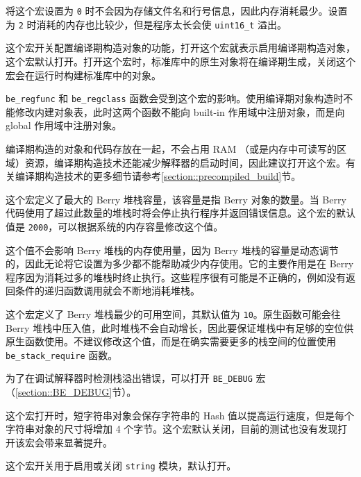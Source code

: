将这个宏设置为 \texttt{0} 时不会因为存储文件名和行号信息，因此内存消耗最少。设置为 \texttt{2} 时消耗的内存也比较少，但是程序太长会使 \texttt{uint16\_t} 溢出。


这个宏开关配置编译期构造对象的功能，打开这个宏就表示启用编译期构造对象，这个宏默认打开。打开这个宏时，标准库中的原生对象将在编译期生成，关闭这个宏会在运行时构建标准库中的对象。

\texttt{be\_regfunc} 和 \texttt{be\_regclass} 函数会受到这个宏的影响。使用编译期对象构造时不能修改内建对象表，此时这两个函数不能向 built-in 作用域中注册对象，而是向 global 作用域中注册对象。

编译期构造的对象和代码存放在一起，不会占用 RAM （或是内存中可读写的区域）资源，编译期构造技术还能减少解释器的启动时间，因此建议打开这个宏。有关编译期构造技术的更多细节请参考\ref{section::precompiled_build}节。


这个宏定义了最大的 Berry 堆栈容量，该容量是指 Berry 对象的数量。当 Berry 代码使用了超过此数量的堆栈时将会停止执行程序并返回错误信息。这个宏的默认值是 \texttt{2000}，可以根据系统的内存容量修改这个值。

这个值不会影响 Berry 堆栈的内存使用量，因为 Berry 堆栈的容量是动态调节的，因此无论将它设置为多少都不能帮助减少内存使用。它的主要作用是在 Berry 程序因为消耗过多的堆栈时终止执行。这些程序很有可能是不正确的，例如没有返回条件的递归函数调用就会不断地消耗堆栈。


这个宏定义了 Berry 堆栈最少的可用空间，其默认值为 \texttt{10}。原生函数可能会往 Berry 堆栈中压入值，此时堆栈不会自动增长，因此要保证堆栈中有足够的空位供原生函数使用。不建议修改这个值，而是在确实需要更多的栈空间的位置使用 \texttt{be\_stack\_require} 函数。

为了在调试解释器时检测栈溢出错误，可以打开 \texttt{BE\_DEBUG} 宏（\ref{section::BE_DEBUG}节）。


这个宏打开时，短字符串对象会保存字符串的 Hash 值以提高运行速度，但是每个字符串对象的尺寸将增加 4 个字节。这个宏默认关闭，目前的测试也没有发现打开该宏会带来显著提升。


这个宏开关用于启用或关闭 \texttt{string} 模块，默认打开。


